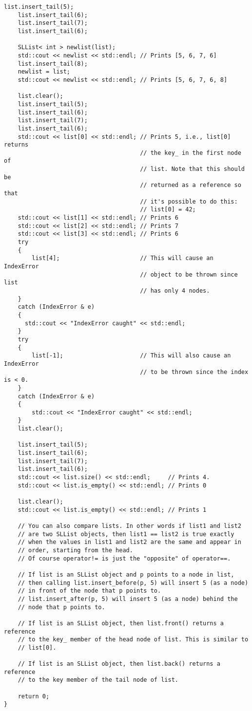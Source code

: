 \begin{Verbatim}[frame=single,commandchars=\~\@\$,fontsize=\footnotesize]
    list.insert_tail(5);
    list.insert_tail(6);
    list.insert_tail(7);
    list.insert_tail(6);

    SLList< int > newlist(list);
    std::cout << newlist << std::endl; // Prints [5, 6, 7, 6]
    list.insert_tail(8);
    newlist = list;
    std::cout << newlist << std::endl; // Prints [5, 6, 7, 6, 8]

    list.clear();
    list.insert_tail(5);
    list.insert_tail(6);
    list.insert_tail(7);
    list.insert_tail(6);
    std::cout << list[0] << std::endl; // Prints 5, i.e., list[0] returns
                                       // the key_ in the first node of 
                                       // list. Note that this should be 
                                       // returned as a reference so that 
                                       // it's possible to do this:
                                       // list[0] = 42;
    std::cout << list[1] << std::endl; // Prints 6
    std::cout << list[2] << std::endl; // Prints 7
    std::cout << list[3] << std::endl; // Prints 6
    try
    {
        list[4];                       // This will cause an IndexError
                                       // object to be thrown since list
                                       // has only 4 nodes.
    }
    catch (IndexError & e)
    {
      std::cout << "IndexError caught" << std::endl;
    }
    try
    {
        list[-1];                      // This will also cause an IndexError
                                       // to be thrown since the index is < 0.
    }
    catch (IndexError & e)
    {
        std::cout << "IndexError caught" << std::endl;
    }
    list.clear();

    list.insert_tail(5);
    list.insert_tail(6);
    list.insert_tail(7);
    list.insert_tail(6);
    std::cout << list.size() << std::endl;     // Prints 4.
    std::cout << list.is_empty() << std::endl; // Prints 0

    list.clear();
    std::cout << list.is_empty() << std::endl; // Prints 1

    // You can also compare lists. In other words if list1 and list2
    // are two SLList objects, then list1 == list2 is true exactly
    // when the values in list1 and list2 are the same and appear in
    // order, starting from the head. 
    // Of course operator!= is just the "opposite" of operator==.

    // If list is an SLList object and p points to a node in list,
    // then calling list.insert_before(p, 5) will insert 5 (as a node)
    // in front of the node that p points to.
    // list.insert_after(p, 5) will insert 5 (as a node) behind the
    // node that p points to.

    // If list is an SLList object, then list.front() returns a reference
    // to the key_ member of the head node of list. This is similar to
    // list[0].

    // If list is an SLList object, then list.back() returns a reference 
    // to the key member of the tail node of list.

    return 0;
}
\end{Verbatim}




